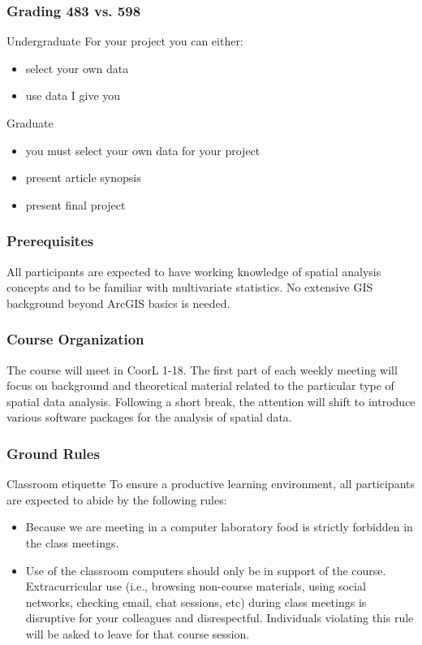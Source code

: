 \documentclass[nototal,handout]{beamer}
\begin{document}
\begin{frame}
	\frametitle{Grading 483 vs. 598}
 
\begin{block}{Undergraduate}
  For your project you can either:
 \begin{itemize}
 \item  select your own data
 \item  use data I give you
 \end{itemize}
 \end{block} 
\begin{block}{Graduate}
 \begin{itemize}
 \item  you must select your own data for your project
 \item  present article synopsis
 \item  present final project
 \end{itemize}
 \end{block} 
 \end{frame}

\begin{frame}
	\frametitle{Prerequisites}
  All participants are expected to have  working knowledge of spatial
  analysis concepts and to be familiar with multivariate statistics. No
  extensive GIS background beyond ArcGIS basics is needed.
 \end{frame} 

\begin{frame}
	\frametitle{Course Organization}

The course will meet in CoorL 1-18. The first part of each
weekly meeting will focus on background and theoretical material related to
the particular type of spatial data analysis. Following a short break, the
attention will shift to introduce various software packages for the analysis
of spatial data.
 \end{frame} 

 \begin{frame}
   \frametitle{Ground Rules}
   \begin{block}{Classroom etiquette}
      To ensure a productive learning environment, all
participants are expected to abide by the following rules:
\begin{itemize}
  \item Because we are meeting in a computer laboratory
food is strictly forbidden in the class meetings.
\item Use of the classroom computers should only be in support of the course.
  Extracurricular use (i.e., browsing non-course materials, using  social networks, checking
  email, chat sessions, etc) during class meetings is disruptive for your colleagues and
  disrespectful. Individuals violating this rule will be asked to leave for
  that course session.
\end{itemize}

    \end{block}
  \end{frame}
\end{document}
